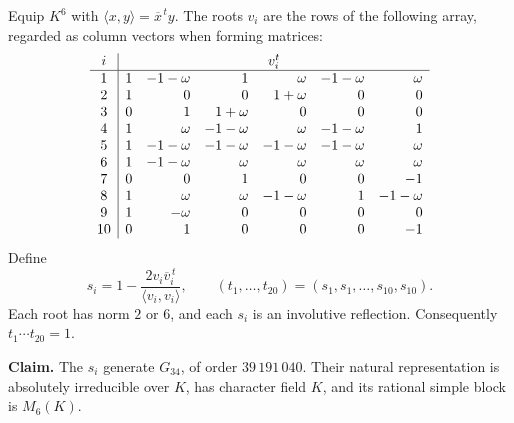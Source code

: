 Equip \(K^6\) with \(\langle x,y\rangle=\overline{x}^{\,t}y\).  The roots
\(v_i\) are the rows of the following array, regarded as column vectors when
forming matrices:
\[
\begin{array}{c|rrrrrr}
i&\multicolumn{6}{c}{v_i^t}\\\hline
1&1&-1-\omega&1&\omega&-1-\omega&\omega\\
2&1&0&0&1+\omega&0&0\\
3&0&1&1+\omega&0&0&0\\
4&1&\omega&-1-\omega&\omega&-1-\omega&1\\
5&1&-1-\omega&-1-\omega&-1-\omega&-1-\omega&\omega\\
6&1&-1-\omega&\omega&\omega&\omega&\omega\\
7&0&0&1&0&0&-1\\
8&1&\omega&\omega&-1-\omega&1&-1-\omega\\
9&1&-\omega&0&0&0&0\\
10&0&1&0&0&0&-1
\end{array}
\]
Define
\[
 s_i=1-\frac{2v_i\overline v_i^{\,t}}{\langle v_i,v_i\rangle},\qquad
 (t_1,\ldots,t_{20})=(s_1,s_1,\ldots,s_{10},s_{10}).
\]
Each root has norm \(2\) or \(6\), and each \(s_i\) is an involutive
reflection.  Consequently \(t_1\cdots t_{20}=1\).

\textbf{Claim.} The \(s_i\) generate \(G_{34}\), of order \(39\,191\,040\).
Their natural representation is absolutely irreducible over \(K\), has
character field \(K\), and its rational simple block is \(M_6(K)\).

